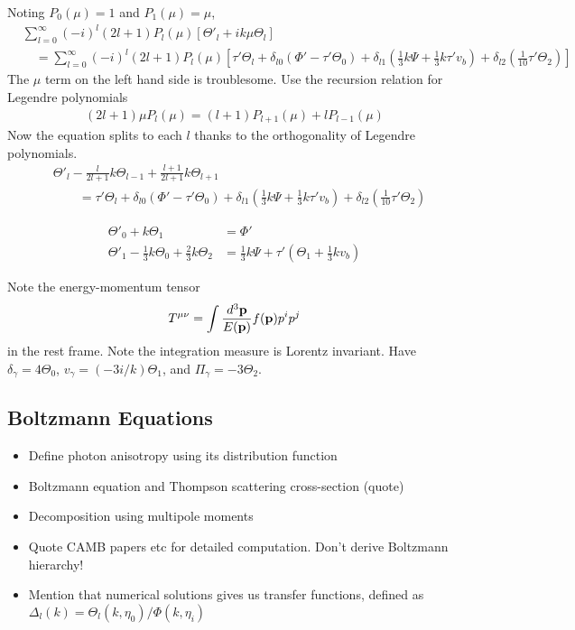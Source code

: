 Noting $P_0(\mu) = 1$ and $P_1(\mu)=\mu$,
\begin{align}
	&\sum_{l=0}^{\infty} (-i)^l (2l+1) P_l (\mu) \left[ \Theta'_l + ik\mu \Theta_l \right] \nonumber\\
	&\quad= \sum_{l=0}^{\infty} (-i)^l (2l+1) P_l (\mu) \left[ \tau' \Theta_l + \delta_{l0} (\Phi' - \tau'\Theta_0) + \delta_{l1} (\frac{1}{3}k\Psi + \frac{1}{3}k\tau' v_b) + \delta_{l2}(\frac{1}{10}\tau' \Theta_2) \right]
\end{align}
The $\mu$ term on the left hand side is troublesome. Use the recursion relation for Legendre polynomials
\begin{align}
	(2l+1)\mu P_l(\mu) = (l+1) P_{l+1} (\mu) + l P_{l-1} (\mu)
\end{align}
Now the equation splits to each $l$ thanks to the orthogonality of Legendre polynomials.
\begin{align}
	&\Theta'_l - \frac{l}{2l+1} k\Theta_{l-1} + \frac{l+1}{2l+1} k\Theta_{l+1}  \nonumber\\
	&\qquad= \tau' \Theta_l + \delta_{l0} (\Phi' - \tau' \Theta_0) + \delta_{l1} (\frac{1}{3} k\Psi + \frac{1}{3} k\tau' v_b) + \delta_{l2}(\frac{1}{10}\tau' \Theta_2)
\end{align}

\begin{align}
	\Theta'_0 + k\Theta_1 &= \Phi' \\
	\Theta'_1 - \frac{1}{3} k\Theta_0 +\frac{2}{3} k\Theta_2 &= \frac{1}{3} k \Psi + \tau'(\Theta_1 + \frac{1}{3} k v_b)
\end{align}


Note the energy-momentum tensor
\begin{align}
	T^{\mu\nu} = \int \frac{d^3 \mathbf{p}}{E(\mathbf{p})} f(\mathbf{p}) p^i p^j
\end{align}
in the rest frame. Note the integration measure is Lorentz invariant. Have $\delta_\gamma = 4\Theta_0$, $v_\gamma = (-3i/k) \Theta_1$, and $\Pi_\gamma = -3\Theta_2$.


\subsection{Boltzmann Equations}


\begin{itemize}
	\item Define photon anisotropy using its distribution function
	\item Boltzmann equation and Thompson scattering cross-section (quote)
	\item Decomposition using multipole moments
	\item Quote CAMB papers etc for detailed computation. Don't derive Boltzmann hierarchy!
	\item Mention that numerical solutions gives us transfer functions, defined as $\Delta_l (k) = \Theta_l(k,\eta_0) / \Phi(k,\eta_i)$
\end{itemize}



